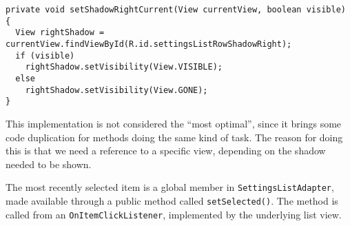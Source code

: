 \begin{lstlisting}[caption={One of three methods setting the visibility of shadows related to the selected list item.}, label={lst:settingslistadapter:shadow}]
private void setShadowRightCurrent(View currentView, boolean visible) {
  View rightShadow = currentView.findViewById(R.id.settingsListRowShadowRight);
  if (visible)
    rightShadow.setVisibility(View.VISIBLE);
  else
    rightShadow.setVisibility(View.GONE);
}
\end{lstlisting}

This implementation is not considered the ``most optimal'', since it brings some code duplication for methods doing the same kind of task.
The reason for doing this is that we need a reference to a specific view, depending on the shadow needed to be shown.

The most recently selected item is a global member in \lstinline|SettingsListAdapter|, made available through a public method called \lstinline|setSelected()|.
The method is called from an \lstinline|OnItemClickListener|, implemented by the underlying list view.